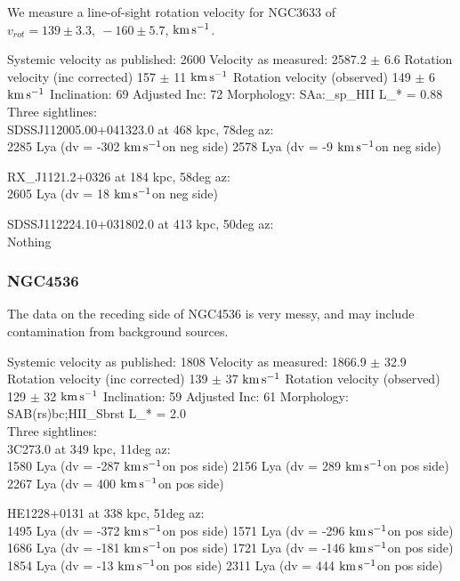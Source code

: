 \documentclass[iop]{emulateapj-rtx4}
\newcommand{\kms}{$\rm km\, s^{-1}$}
\begin{document}
We measure a line-of-sight rotation velocity for NGC3633 of $v_{rot}=139\pm 3.3,~-160\pm5.7$,  \kms.


Systemic velocity as published: 2600
Velocity as measured: 2587.2 $\pm$ 6.6
Rotation velocity (inc corrected) 157 $\pm$ 11 \kms
Rotation velocity (observed) 149 $\pm$ 6 \kms
Inclination: 69
Adjusted Inc: 72
Morphology: SAa:_sp_HII
L_{\**} = 0.88 \\

Three sightlines: \\
SDSSJ112005.00+041323.0 at 468 kpc, 78deg az: \\
2285 Lya (dv = -302 \kms on neg side)
2578 Lya (dv = -9 \kms on neg side)


RX_J1121.2+0326 at 184 kpc, 58deg az: \\
2605 Lya (dv = 18 \kms on neg side)


SDSSJ112224.10+031802.0 at 413 kpc, 50deg az: \\
Nothing


\subsubsection{NGC4536}
The data on the receding side of NGC4536 is very messy, and may include contamination from background sources. 



Systemic velocity as published: 1808
Velocity as measured: 1866.9 $\pm$ 32.9
Rotation velocity (inc corrected) 139 $\pm$ 37 \kms
Rotation velocity (observed) 129 $\pm$ 32 \kms
Inclination: 59
Adjusted Inc: 61
Morphology: SAB(rs)bc;HII_Sbrst
L_{\**} = 2.0 \\

Three sightlines: \\
3C273.0 at 349 kpc, 11deg az: \\
1580 Lya (dv = -287 \kms on pos side)
2156 Lya (dv = 289 \kms on pos side)
2267 Lya (dv = 400 \kms on pos side)


HE1228+0131 at 338 kpc, 51deg az: \\
1495 Lya (dv = -372 \kms on pos side)
1571 Lya (dv = -296 \kms on pos side)
1686 Lya (dv = -181 \kms on pos side)
1721 Lya (dv = -146 \kms on pos side)
1854 Lya (dv = -13 \kms on pos side)
2311 Lya (dv = 444 \kms on pos side)
\end{document}
